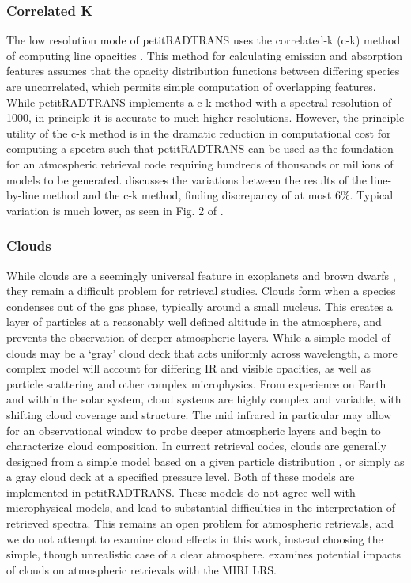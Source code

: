 \subsubsection{Correlated K}
The low resolution mode of petitRADTRANS uses the correlated-k (c-k) method of computing line opacities \parencite{Goody1989,Lacis1991,Fu1992}. 
This method for calculating emission and absorption features assumes that the opacity distribution functions between differing species are uncorrelated, which permits simple computation of overlapping features. 
While petitRADTRANS implements a c-k method with a spectral resolution of 1000, in principle it is accurate to much higher resolutions.
However, the principle utility of the c-k method is in the dramatic reduction in computational cost for computing a spectra such that petitRADTRANS can be used as the foundation for an atmospheric retrieval code requiring hundreds of thousands or millions of models to be generated. 
\parencite{Molliere2019} discusses the variations between the results of the line-by-line method and the c-k method, finding discrepancy of at most 6\%.
Typical variation is much lower, as seen in Fig. 2 of \parencite{Molliere2019}.

\subsubsection{Clouds}
While clouds are a seemingly universal feature in exoplanets and brown dwarfs \parencite{Morley2014,Line2016,Faherty2018}, they remain a difficult problem for retrieval studies. 
Clouds form when a species condenses out of the gas phase, typically around a small nucleus.
This creates a layer of particles at a reasonably well defined altitude in the atmosphere, and prevents the observation of deeper atmospheric layers.
While a simple model of clouds may be a `gray' cloud deck that acts uniformly across wavelength, a more complex model will account for differing IR and visible opacities, as well as particle scattering and other complex microphysics.
From experience on Earth and within the solar system, cloud systems are highly complex and variable, with shifting cloud coverage and structure.
The mid infrared in particular may allow for an observational window to probe deeper atmospheric layers and begin to characterize cloud composition.
In current retrieval codes, clouds are generally designed from a simple model based on a given particle distribution \parencite{Ackerman2001}, or simply as a gray cloud deck at a specified pressure level.
Both of these models are implemented in petitRADTRANS.
These models do not agree well with microphysical models, and lead to substantial difficulties in the interpretation of retrieved spectra.
This remains an open problem for atmospheric retrievals, and we do not attempt to examine cloud effects in this work, instead choosing the simple, though unrealistic case of a clear atmosphere. 
\parencite{Schlawin2018} examines potential impacts of clouds on atmospheric retrievals with the MIRI LRS.


